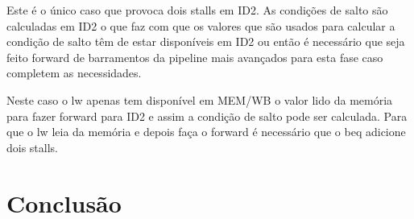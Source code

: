 \documentclass[pdftex,12pt,a4paper]{report}
\begin{document}
Este é o único caso que provoca dois stalls em ID2. As condições de salto são calculadas em ID2 o que faz com que os valores que são usados para calcular a condição de salto têm de estar disponíveis em ID2 ou então é necessário que seja feito forward de barramentos da pipeline mais avançados para esta fase caso completem as necessidades. 

Neste caso o lw apenas tem disponível em MEM/WB o valor lido da memória para fazer forward para ID2 e assim a condição de salto pode ser calculada. Para que o lw leia da memória e depois faça o forward é necessário que o beq adicione dois stalls.

\newpage
\section{Conclusão}
\end{document}
